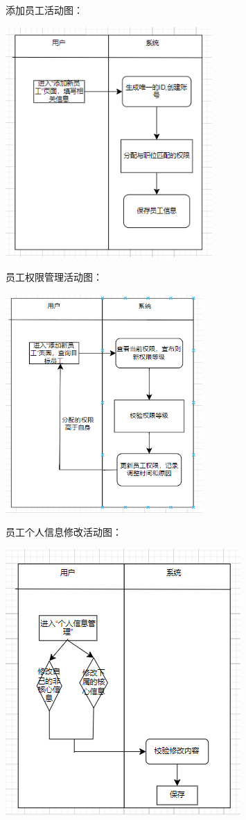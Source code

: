 \documentclass[]{article}
\begin{document}
添加员工活动图：

\includegraphics[width=3.10417in,height=3.45694in]{media/media/image8.png}

员工权限管理活动图：

\includegraphics[width=2.95972in,height=3.28333in]{media/media/image9.png}

员工个人信息修改活动图：

\includegraphics[width=3.53194in,height=3.98264in]{media/media/image10.png}
\end{document}
